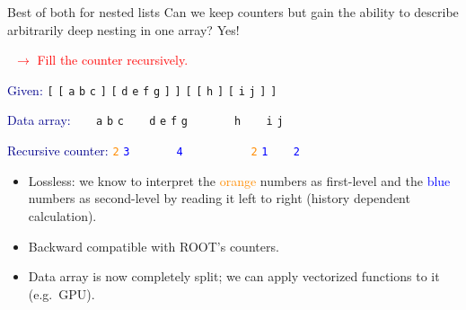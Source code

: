 \documentclass{beamer}
\begin{document}
\begin{frame}{Best of both for nested lists}
\vspace{0.5 cm}
Can we keep counters but gain the ability to describe arbitrarily deep nesting in one array? Yes!

\vspace{0.2 cm}
\textcolor{red}{\mbox{\hspace{1 cm} $\rightarrow$} Fill the counter recursively.}

\vspace{0.3 cm}
\textcolor{darkblue}{Given:} \hfill {\tt [} {\tt [} {\tt a} {\tt b} {\tt c} {\tt ]} {\tt [} {\tt d} {\tt e} {\tt f} {\tt g} {\tt ]} {\tt ]} {\tt [} {\tt [} {\tt h} {\tt ]} {\tt [} {\tt i} {\tt j} {\tt ]} {\tt ]}

\textcolor{darkblue}{Data array:} \hfill {\tt \ } {\tt \ } {\tt a} {\tt b} {\tt c} {\tt \ } {\tt \ } {\tt d} {\tt e} {\tt f} {\tt g} {\tt \ } {\tt \ } {\tt \ } {\tt \ } {\tt h} {\tt \ } {\tt \ } {\tt i} {\tt j} {\tt \ } {\tt \ }

\textcolor{darkblue}{Recursive counter:} \hfill \textcolor{darkorange}{\tt 2} \textcolor{blue}{\tt 3} {\tt \ } {\tt \ } {\tt \ } {\tt \ } \textcolor{blue}{\tt 4} {\tt \ } {\tt \ } {\tt \ } {\tt \ } {\tt \ } {\tt \ } \textcolor{darkorange}{\tt 2} \textcolor{blue}{\tt 1} {\tt \ } {\tt \ } \textcolor{blue}{\tt 2} {\tt \ } {\tt \ } {\tt \ } {\tt \ }

\vspace{0.3 cm}
\begin{itemize}
\item Lossless: we know to interpret the \textcolor{darkorange}{orange} numbers as first-level and the \textcolor{blue}{blue} numbers as second-level by reading it left to right (history dependent calculation).

\item Backward compatible with ROOT's counters.

\item Data array is now completely split; we can apply vectorized functions to it (e.g.\ GPU).
\end{itemize}
\end{frame}

\begin{frame}{}

\end{frame}


\end{document}

